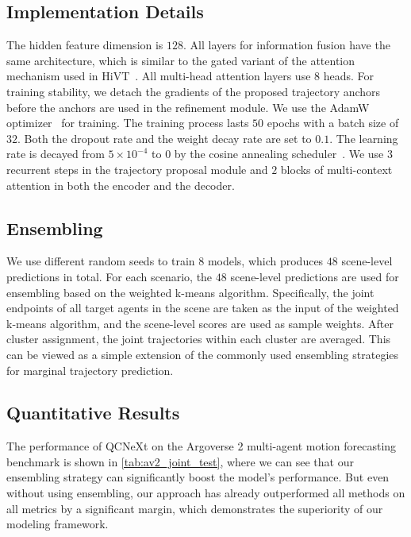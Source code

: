 \documentclass[10pt,twocolumn,letterpaper]{article}
\begin{document}
\subsection{Implementation Details}

The hidden feature dimension is $128$. All layers for information fusion have the same architecture, which is similar to the gated variant of the attention mechanism used in HiVT~\cite{zhou2022hivt}. All multi-head attention layers use $8$ heads. For training stability, we detach the gradients of the proposed trajectory anchors before the anchors are used in the refinement module. We use the AdamW optimizer~\cite{loshchilov2017decoupled} for training. The training process lasts $50$ epochs with a batch size of $32$. Both the dropout rate and the weight decay rate are set to $0.1$. The learning rate is decayed from $5 \times 10^{-4}$ to $0$ by the cosine annealing scheduler~\cite{loshchilov2016sgdr}. We use $3$ recurrent steps in the trajectory proposal module and $2$ blocks of multi-context attention in both the encoder and the decoder.

\subsection{Ensembling}

We use different random seeds to train $8$ models, which produces $48$ scene-level predictions in total. For each scenario, the $48$ scene-level predictions are used for ensembling based on the weighted k-means algorithm. Specifically, the joint endpoints of all target agents in the scene are taken as the input of the weighted k-means algorithm, and the scene-level scores are used as sample weights. After cluster assignment, the joint trajectories within each cluster are averaged. This can be viewed as a simple extension of the commonly used ensembling strategies for marginal trajectory prediction.

\subsection{Quantitative Results}

The performance of QCNeXt on the Argoverse 2 multi-agent motion forecasting benchmark is shown in \cref{tab:av2_joint_test}, where we can see that our ensembling strategy can significantly boost the model's performance. But even without using ensembling, our approach has already outperformed all methods on all metrics by a significant margin, which demonstrates the superiority of our modeling framework.
\end{document}
